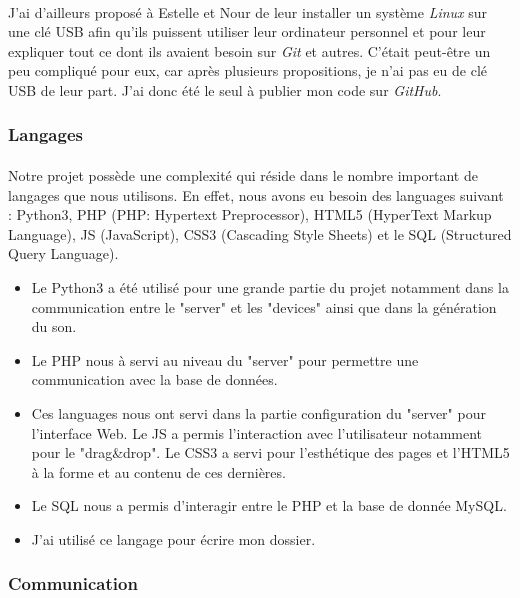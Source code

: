 \documentclass[12pt]{article}
\begin{document}
	\paragraph{}
	J'ai d'ailleurs proposé à Estelle et Nour de leur installer un système \textit{Linux} sur une clé USB afin qu'ils puissent utiliser leur ordinateur personnel et pour leur expliquer tout ce dont ils avaient besoin sur \textit{Git} et autres. C'était peut-être un peu compliqué pour eux, car après plusieurs propositions, je n'ai pas eu de clé USB de leur part. J'ai donc été le seul à publier mon code sur \textit{GitHub}.
	\subsubsection{Langages}
	\paragraph{}
	Notre projet possède une complexité qui réside dans le nombre important de langages que nous utilisons. En effet, nous avons eu besoin des languages suivant : Python3, PHP (PHP: Hypertext Preprocessor), HTML5 (HyperText Markup Language), JS (JavaScript), CSS3 (Cascading Style Sheets) et le SQL (Structured Query Language).
	
	\begin{itemize}
		\item[\textbf{Python3}] Le Python3 a été utilisé pour une grande partie du projet notamment dans la communication entre le "server" et les "devices" ainsi que dans la génération du son.
		\item[\textbf{PHP}] Le PHP nous à servi au niveau du "server" pour permettre une communication avec la base de données. 
		\item[\textbf{HTML5, JS, CSS3}] Ces languages nous ont servi dans la partie configuration du "server" pour l'interface Web. Le JS a permis l'interaction avec l'utilisateur notamment pour le "drag\&drop". Le CSS3 a servi pour l'esthétique des pages et l'HTML5 à la forme et au contenu de ces dernières.
		\item [\textbf{SQL}] Le SQL nous a permis d'interagir entre le PHP et la base de donnée MySQL.
		\item[\textbf{\LaTeX}] J'ai utilisé ce langage pour écrire mon dossier.
	\end{itemize}
	\subsubsection{Communication}
\end{document}
